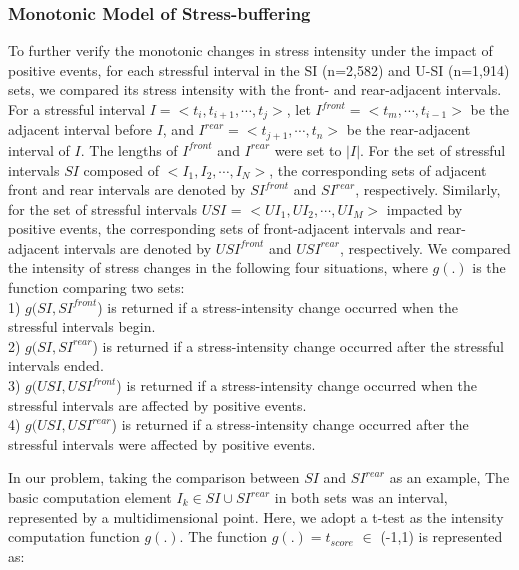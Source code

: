 \documentclass[5p,times,numbers,authoryear]{elsarticle}
\begin{document}
\subsubsection{Monotonic Model of Stress-buffering}
\label{sec:mono}
To further verify the monotonic changes in stress intensity under the impact of positive events,
for each stressful interval in the SI (n=2,582) and U-SI (n=1,914) sets,
we compared its stress intensity with the front- and rear-adjacent intervals.
For a stressful interval $I = <t_i,t_{i+1},\cdots,t_j>$,
let $I^{front} = <t_m,\cdots,t_{i-1}>$ be the adjacent interval before $I$,
and $I^{rear} = <t_{j+1},\cdots,t_n>$ be the rear-adjacent interval of $I$.
The lengths of $I^{front}$ and $I^{rear}$ were set to $|I|$.
For the set of stressful intervals $SI$ composed of $<I_1,I_2,\cdots,I_N>$, 
the corresponding sets of adjacent front and rear intervals are denoted by $SI^{front}$ and $SI^{rear}$, respectively.
Similarly, for the set of stressful intervals $USI$ = $<UI_1,UI_2,\cdots, UI_M>$ impacted by positive events, 
the corresponding sets of front-adjacent intervals and rear-adjacent intervals are denoted by $USI^{front}$ and $USI^{rear}$, respectively.
We compared the intensity of stress changes in the following four situations,
where $g(.)$ is the function comparing two sets: \\
1) $g(SI,SI^{front}$) is returned if a stress-intensity change occurred when the stressful intervals begin.\\
2) $g(SI,SI^{rear}$) is returned if a stress-intensity change occurred after the stressful intervals ended.\\
3) $g(USI,USI^{front}$) is returned if a stress-intensity change occurred when the stressful intervals are affected by positive events.\\
4) $g(USI,USI^{rear}$) is returned if a stress-intensity change occurred after the stressful intervals were affected by positive events.

In our problem, taking the comparison between $SI$ and $SI^{rear}$ as an example,
The basic computation element $I_k \in SI \cup SI^{rear}$ in both sets was an interval, represented by a multidimensional point.
Here, we adopt a t-test as the intensity computation function $g(.)$.
The function $g(.) = t_{score}$ $\in$ (-1,1) is represented as:
\end{document}
